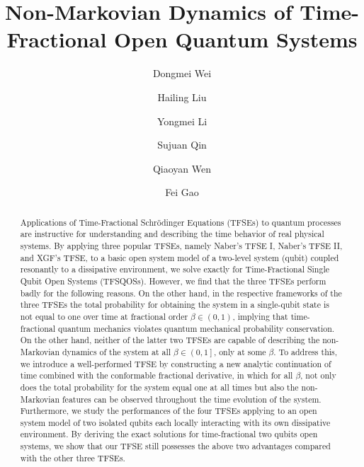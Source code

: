 \documentclass[
showpacs,  %
showkeys,  %
aps,       %
amsthm,    %
amsmath,   %
amsfonts,  %
amssymb    %
]{revtex4-1}          %
\begin{document}

\title{Non-Markovian Dynamics of Time-Fractional Open Quantum Systems}

\author{Dongmei Wei}

\author{Hailing Liu}

\author{Yongmei Li}

\author{Sujuan Qin}

\author{Qiaoyan Wen}

\author{Fei Gao}


\begin{abstract}
Applications of Time-Fractional Schr\"{o}dinger Equations (TFSEs) to quantum processes are instructive for understanding and describing the time behavior of real physical systems. By applying three popular TFSEs, namely Naber's TFSE I, Naber's TFSE II, and XGF's TFSE, to a basic open system model of a two-level system (qubit) coupled resonantly to a dissipative environment, we solve exactly for Time-Fractional Single Qubit Open Systems (TFSQOSs). However, we find that the three TFSEs perform badly for the following reasons. On the other hand, in the respective frameworks of the three TFSEs the total probability for obtaining the system in a single-qubit state is not equal to one over time at fractional order $\beta\in\left({0,1}\right)$, implying that time-fractional quantum mechanics violates quantum mechanical probability conservation. On the other hand, neither of the latter two TFSEs are capable of describing the non-Markovian dynamics of the system at all $\beta\in\left({0,1}\right]$, only at some $\beta$. To address this, we introduce a well-performed TFSE by constructing a new analytic continuation of time combined with the conformable fractional derivative, in which for all $\beta$, not only does the total probability for the system equal one at all times but also the non-Markovian features can be observed throughout the time evolution of the system. Furthermore, we study the performances of the four TFSEs applying to an open system model of two isolated qubits each locally interacting with its own dissipative environment. By deriving the exact solutions for time-fractional two qubits open systems, we show that our TFSE still possesses the above two advantages compared with the other three TFSEs.
\end{abstract}
\end{document}
